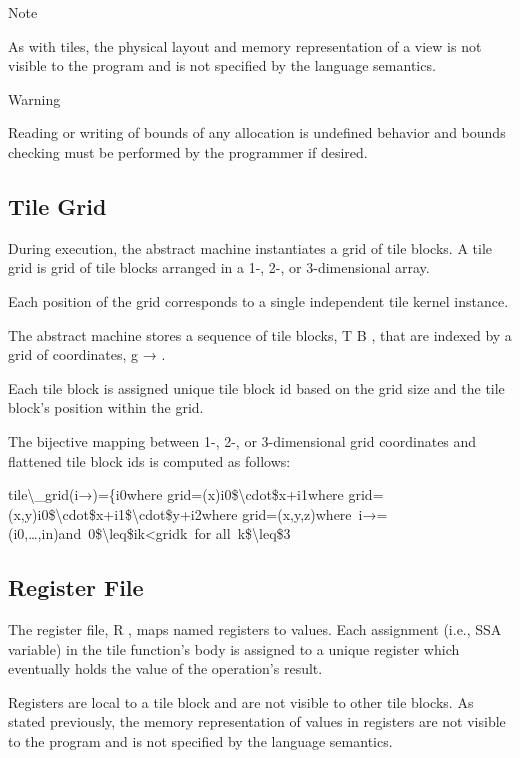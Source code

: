 \documentclass{article}
\begin{document}
Note


As with tiles, the physical layout and memory representation of a view is not visible to the program and is not specified by the language semantics.



Warning


Reading or writing of bounds of any allocation is undefined behavior and bounds checking must be performed by the programmer if desired.




\subsection{Tile Grid}

During execution, the abstract machine instantiates a grid of tile blocks. A tile grid is grid of tile blocks arranged in a 1-, 2-, or 3-dimensional array.


Each position of the grid corresponds to a single independent tile kernel instance.


The abstract machine stores a sequence of tile blocks, T B , that are indexed by a grid of coordinates, g → .

Each tile block is assigned unique tile block id based on the grid size and the tile block's position within the grid.


The bijective mapping between 1-, 2-, or 3-dimensional grid coordinates and flattened tile block ids is computed as follows:


tile\textbackslash{}\_grid(i→)=\{i0where grid=(x)i0\$\textbackslash{}cdot\$x+i1where grid=(x,y)i0\$\textbackslash{}cdot\$x+i1\$\textbackslash{}cdot\$y+i2where grid=(x,y,z)where i→=(i0,…,in)and 0\$\textbackslash{}leq\$ik<gridk for all k\$\textbackslash{}leq\$3


\subsection{Register File}

The register file, R , maps named registers to values. Each assignment (i.e., SSA variable) in the tile function's body is assigned to a unique register which eventually holds the value of the operation's result.

Registers are local to a tile block and are not visible to other tile blocks. As stated previously, the memory representation of values in registers are not visible to the program and is not specified by the language semantics.
\end{document}
